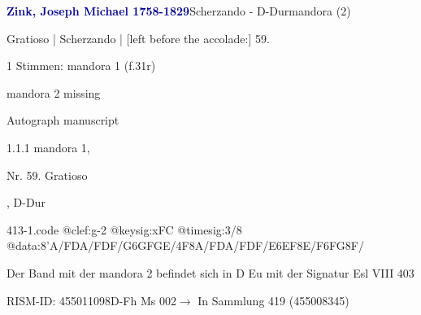 \documentclass[twocolumn]{book}
\begin{document}
\par \vspace{7pt} \textcolor{darkblue}{\textbf{Zink, Joseph Michael  1758-1829}}\hfillplus{\textbf{[413]}}\newline Scherzando - D-Dur\newline mandora (2)
\par \begin{itshape}[f.31r, at left:] Gratioso | Scherzando | [left before the accolade:] 59.\end{itshape} 
\par \textcolor{darkblue}{}  1 Stimmen: mandora 1  (f.31r)\newline \begin{small} mandora 2 missing\end{small} \newline Autograph manuscript
\par 1.1.1  mandora 1, \begin{itshape}Nr. 59. Gratioso\end{itshape}, D-Dur  
\begin{filecontents*}{413-1.code}
@clef:g-2
@keysig:xFC
@timesig:3/8
@data:8'A/FDA/FDF/{G6GFGE}/4F8A/FDA/FDF/{E6EF8E}/{F6FG8F}/
\end{filecontents*}
\newline
%
\par Der Band mit der mandora 2 befindet sich in D Eu mit der Signatur Esl VIII 403
\par RISM-ID: 455011098\newline D-Fh  Ms 002\newline $\rightarrow$ In Sammlung 419 (455008345)
      
\end{document}
